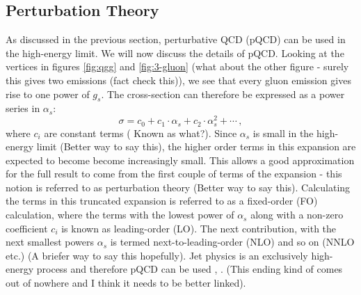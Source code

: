 \subsection{Perturbation Theory}
As discussed in the previous section, perturbative QCD (pQCD) can be used in the high-energy limit. We will now discuss the details of pQCD. Looking at the vertices in figures \ref{fig:qgg} and \ref{fig:3-gluon} {\color{blue}(what about the other figure - surely this gives two emissions (fact check this))}, we see that every gluon emission gives rise to one power of $g_s$. The cross-section can therefore be expressed as a power series in $\alpha_s$:
\begin{equation}
	\sigma=c_0+c_1\cdot\alpha_s+c_2\cdot\alpha_s^2+\cdots\,,
	\label{eq:pQCD}
\end{equation}
where $c_i$ are constant terms {\color{blue}( Known as what?).} 
Since $\alpha_s$ is small in the high-energy limit {\color{blue}(Better way to say this)}, the higher order terms in this expansion are expected to become become increasingly small. This allows a good approximation for the full result to come from the first couple of terms of the expansion -  this notion is referred to as perturbation theory {\color{blue}(Better way to say this)}. Calculating the terms in this truncated expansion is referred to as a fixed-order (FO) calculation, where the terms with the lowest power of $\alpha_s$ along with a non-zero coefficient $c_i$ is known as leading-order (LO). The next contribution, with the next smallest powers $\alpha_s$ is termed next-to-leading-order (NLO) and so on (NNLO etc.) {\color{blue}(A briefer way to say this hopefully).} Jet physics is an exclusively high-energy process and therefore pQCD can be used \cite{Schwartz:2014sze}, \cite{Campbell:2017hsr}. {\color{blue}(This ending kind of comes out of nowhere and I think it needs to be better linked).} 

